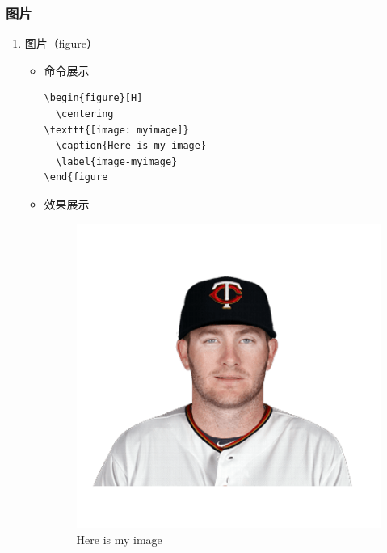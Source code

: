 \documentclass[UTF8]{ctexart}
\begin{document}
\subsubsection{图片}
\begin{enumerate}
  \item 图片（figure）
   \begin{itemize}
      \item 命令展示
\begin{lstlisting}
\begin{figure}[H]
  \centering
\texttt{[image: myimage]}
  \caption{Here is my image}
  \label{image-myimage}
\end{figure
\end{lstlisting}
\item 效果展示
\begin{figure}[H]
  \centering
  \includegraphics[width=1\textwidth]{good}
  \caption{Here is my image}
  \label{image-myimage}
\end{figure}
\end{itemize}
\end{enumerate}
\end{document}
